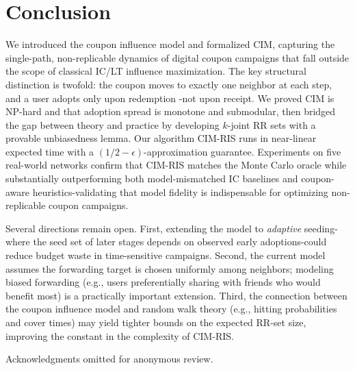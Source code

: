\documentclass[sigconf]{acmart}
\newcommand{\CIMRIS}{\textsc{CIM-RIS}}
\begin{document}
\section{Conclusion}
\label{sec:conclusion}

We introduced the coupon influence model and formalized CIM, capturing the
single-path, non-replicable dynamics of digital coupon campaigns that
fall outside the scope of classical IC/LT influence maximization.
The key structural distinction is twofold: the coupon moves to exactly
one neighbor at each step, and a user adopts only upon redemption
-not upon receipt.
We proved CIM is NP-hard and that adoption spread is monotone and
submodular, then bridged the gap between theory and practice by
developing $k$-joint RR sets with a provable unbiasedness lemma.
Our algorithm \CIMRIS{} runs in near-linear expected time with a
$(1/2{-}\epsilon)$-approximation guarantee.
Experiments on five real-world networks confirm that \CIMRIS{} matches
the Monte Carlo oracle while substantially outperforming both
model-mismatched IC baselines and coupon-aware heuristics-validating
that model fidelity is indispensable for optimizing non-replicable
coupon campaigns.

Several directions remain open.
First, extending the model to \emph{adaptive} seeding-where the
seed set of later stages depends on observed early adoptions-could
reduce budget waste in time-sensitive campaigns.
Second, the current model assumes the forwarding target is chosen
uniformly among neighbors; modeling biased forwarding
(e.g., users preferentially sharing with friends who would benefit
most) is a practically important extension.
Third, the connection between the coupon influence model and random walk theory
(e.g., hitting probabilities and cover times) may yield tighter bounds
on the expected RR-set size, improving the constant in the complexity
of \CIMRIS{}.

\begin{acks}
Acknowledgments omitted for anonymous review.
\end{acks}



\end{document}
